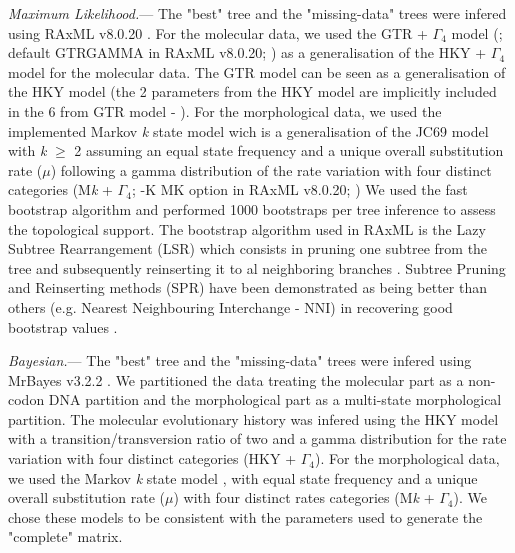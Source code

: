 \documentclass[12pt,letterpaper]{article}
\renewcommand{\subsubsection}[1]{%
\vspace{2ex}
\noindent
\textit{#1.}---}
\begin{document}
\subsubsection{Maximum Likelihood}
The "best" tree and the "missing-data" trees were infered using RAxML v8.0.20 \citep{Stamatakis21012014}.
For the molecular data, we used the GTR + $\Gamma_4$ model (\citet{tavare1986}; default GTRGAMMA in RAxML v8.0.20; \citet{Stamatakis21012014}) as a generalisation of the HKY + $\Gamma_4$ model \citep{HKY85} for the molecular data.
The GTR model can be seen as a generalisation of the HKY model (the 2 parameters from the HKY model are implicitly included in the 6 from GTR model - \citet{stamatakisa2008}).
For the morphological data, we used the implemented Markov \textit{k} state model \citep{lewisa2001} wich is a generalisation of the JC69 model \citep{jc69} with \textit{k} $\geq$ 2 assuming an equal state frequency and a unique overall substitution rate ($\mu$) following a gamma distribution of the rate variation with four distinct categories (M\textit{k} + $\Gamma_4$; -K MK option in RAxML v8.0.20; \citet{Stamatakis21012014})
We used the fast bootstrap algorithm and performed 1000 bootstraps per tree inference to assess the topological support. 
The bootstrap algorithm used in RAxML is the Lazy Subtree Rearrangement (LSR) which consists in pruning one subtree from the tree and subsequently reinserting it to al neighboring branches \citep{stamatakisa2008}.
Subtree Pruning and Reinserting methods (SPR) have been demonstrated as being better than others (e.g. Nearest Neighbouring Interchange - NNI) in recovering good bootstrap values \citep{salamin2003}.

\subsubsection{Bayesian}
The "best" tree and the "missing-data" trees were infered using MrBayes v3.2.2 \citep{Ronquist2012mrbayes}.
We partitioned the data treating the molecular part as a non-codon DNA partition and the morphological part as a multi-state morphological partition.
The molecular evolutionary history was infered using the HKY model with a transition/transversion ratio \citep{douadycomparison2003} of two and a gamma distribution for the rate variation with four distinct categories (HKY + $\Gamma_4$).
For the morphological data, we used the Markov \textit{k} state model \citep{lewisa2001}, with equal state frequency and a unique overall substitution rate ($\mu$) with four distinct rates categories (M\textit{k} + $\Gamma_4$).
We chose these models to be consistent with the parameters used to generate the "complete" matrix.
\end{document}
